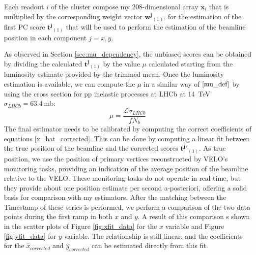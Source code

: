 Each readout $i$ of the cluster compose my 208-dimensional array $\mathbf{x}_i$ that is multiplied by the corresponding weight vector $\mathbf{w^j}_{(1)}$, for the estimation of the first PC score $\mathbf{t^j}_{(1)}$ that will be used to perform the estimation of the beamline position in each component $j=x,y$. 

As observed in Section \ref{sec:mu_dependency}, the unbiased scores can be obtained by dividing the calculated $\mathbf{t^j}_{(1)}$ by the value $\mu$ calculated starting from the luminosity estimate provided by the trimmed mean. Once the luminosity estimation is available, we can compute the $\mu$ in a similar way of $\eqref{mu_def}$ by using the cross section for pp inelastic processes at LHCb at \SI{14}{\tera\eV} $\sigma_{LHCb}=\SI{63.4}{\milli\barn}$:
\begin{equation}
    \mu = \frac{\mathcal{L}\sigma_{LHCb}}{f N_b}
\end{equation}
The final estimator needs to be calibrated by computing the correct coefficients of equations \ref{x_hat_corrected}. This can be done by computing a linear fit between the true position of the beamline and the corrected scores $\mathbf{t^j}'_{(1)}$. As true position, we use the position of primary vertices reconstructed by VELO's monitoring tasks, providing an indication of the average position of the beamline relative to the VELO. These monitoring tasks do not operate in real-time, but they provide about one position estimate per second a-posteriori, offering a solid basis for comparison with my estimators. After the matching between the Timestamp of these series is performed, we perform a comparison of the two data points during the first ramp in both $x$ and $y$. A result of this comparison s shown in the scatter plots of Figure \ref{fig:xfit_data} for the $x$ variable and Figure \ref{fig:yfit_data} for $y$ variable. The relationship is still linear, and the coefficients for the $\hat{x}_{corrected}$ and $\hat{y}_{corrected}$ can be estimated directly from this fit.


